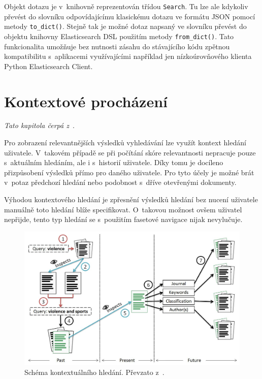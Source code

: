 Objekt dotazu je v~knihovně reprezentován třídou \texttt{Search}. Tu lze ale kdykoliv převést do slovníku odpovídajícímu klasickému dotazu ve formátu JSON pomocí metody \texttt{to\_dict()}. Stejně tak je možné dotaz napsaný ve slovníku převést do objektu knihovny Elasticsearch DSL použitím metody \texttt{from\_dict()}. Tato funkcionalita umožňuje bez nutnosti zásahu do stávajícího kódu zpětnou kompatibilitu s~aplikacemi využívajícími například jen nízkoúrovňového klienta Python Elasticsearch Client.


\section{Kontextové procházení}
\emph{Tato kapitola čerpá z~\cite{bib:similarity-context}}.

Pro zobrazení relevantnějších výsledků vyhledávání lze využít kontext hledání uživatele. V~takovém případě se při počítání skóre relevantnosti nepracuje pouze s~aktuálním hledáním, ale i s~historií uživatele. Díky tomu je docíleno přizpůsobení výsledků přímo pro daného uživatele.
Pro tyto účely je možné brát v~potaz předchozí hledání nebo podobnost s~dříve otevřenými dokumenty.

Výhodou kontextového hledání je zpřesnění výsledků hledání bez nucení uživatele manuálně toto hledání blíže specifikovat. O~takovou možnost ovšem uživatel nepřijde, tento typ hledání se s~použitím fasetové navigace nijak nevylučuje. 

\begin{figure}[H]
	\centering
	\includegraphics[width=\textwidth]{obrazky-figures/contextual.png}
	\caption{Schéma kontextuálního hledání. Převzato z~\cite{bib:similarity-context}.}
	\label{img:contextual}
\end{figure}

